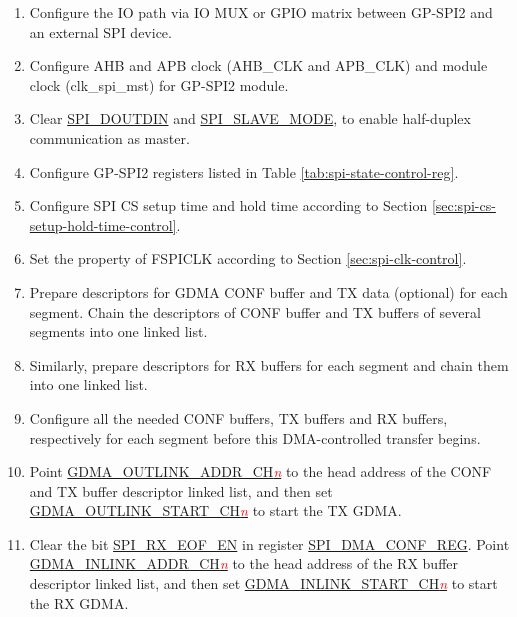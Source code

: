 \documentclass[main\_\_EN.tex]{subfiles}
\begin{document}
 \begin{enumerate}
    \item Configure the IO path via IO MUX or GPIO matrix between GP-SPI2 and an external SPI device.
    \item Configure AHB and APB clock (AHB\_CLK and APB\_CLK) and module clock (clk\_spi\_mst) for GP-SPI2 module.

    \item Clear \hyperref[fielddesc:SPIDOUTDIN]{SPI\_DOUTDIN} and \hyperref[fielddesc:SPISLAVEMODE]{SPI\_SLAVE\_MODE}, to enable half-duplex communication as master.

    \item Configure GP-SPI2 registers listed in Table \ref{tab:spi-state-control-reg}.

    \item Configure SPI CS setup time and hold time according to Section \ref{sec:spi-cs-setup-hold-time-control}.

    \item Set the property of FSPICLK according to Section \ref{sec:spi-clk-control}.

   \item Prepare descriptors for GDMA CONF buffer and TX data (optional) for each segment. Chain the descriptors of CONF buffer and TX buffers of several segments into one linked list.

   \item Similarly, prepare descriptors for RX buffers for each segment and chain them into one linked list.
   \item Configure all the needed CONF buffers, TX buffers and RX buffers, respectively for each segment before this DMA-controlled transfer begins.

   \item Point \hyperref[fielddesc:GDMAOUTLINKADDRCHN]{GDMA\_OUTLINK\_ADDR\_CH\textcolor{red}{\it{n}}} to the head address of the CONF and TX buffer descriptor linked list, and then set \hyperref[fielddesc:GDMAOUTLINKSTARTCHN]{GDMA\_OUTLINK\_START\_CH\textcolor{red}{\it{n}}} to start the TX GDMA.

   \item Clear the bit \hyperref[fielddesc:SPIRXEOFEN]{SPI\_RX\_EOF\_EN} in register \hyperref[regdesc:SPIDMACONFREG]{SPI\_DMA\_CONF\_REG}. Point \hyperref[fielddesc:GDMAINLINKADDRCHN]{GDMA\_INLINK\_ADDR\_CH\textcolor{red}{\it{n}}} to the head address of the RX buffer descriptor linked list, and then set \hyperref[fielddesc:GDMAINLINKSTARTCHN]{GDMA\_INLINK\_START\_CH\textcolor{red}{\it{n}}} to start the RX GDMA.


\end{enumerate}
\end{document}
